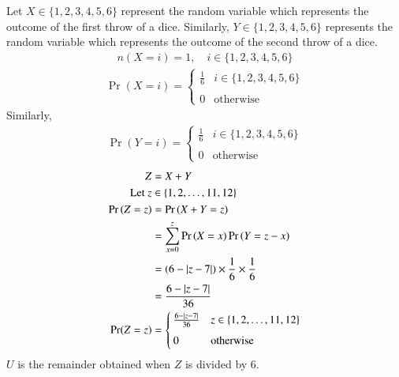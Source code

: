 Let $X \in \{1,2,3,4,5,6\}$ represent the random variable which represents the outcome of the first throw of a dice. Similarly, $Y \in \{1,2,3,4,5,6\}$ represents the random variable which represents the outcome of the second throw of a dice.
\begin{align}
    n(X=i) = 1, \quad i \in \{1, 2, 3, 4, 5, 6\}
\end{align}
\begin{align}
    \Pr(X=i) = 
	\begin{cases}
	\frac{1}{6}   &  i \in \{1, 2, 3, 4, 5, 6\}\\ ~\\[-1em]
	0 & \text{otherwise}
	\end{cases}
\end{align}
Similarly, 
\begin{align}
    \Pr(Y=i) = 
	\begin{cases}
	\frac{1}{6}   &  i \in \{1, 2, 3, 4, 5, 6\}\\ ~\\[-1em]
	0 & \text{otherwise}
	\end{cases}
\end{align}
\begin{align}
    Z &= X+Y
    \\ \text{Let } z &\in \{1, 2, \hdots, 11, 12\}
    \\\Pr{(Z=z)} &= \Pr{(X+Y = z)}
    \\ &= \sum_{x=0}^z \Pr{(X=x)}\Pr{(Y=z-x)}
    \\ &= (6 - \left\vert z-7\right\vert) \times\frac{1}{6}\times\frac{1}{6}
    \\ &= \frac{6 - \left\vert z-7\right\vert}{36}
    \\\Pr(Z=z) &= 
	\begin{cases}
	\frac{6 - \left\vert z-7\right\vert}{36}   &  z \in \{1, 2, \hdots, 11, 12\}\\ ~\\[-1em]
	0 & \text{otherwise}
	\end{cases}
\end{align}
$U$ is the remainder obtained when $Z$ is divided by 6.
